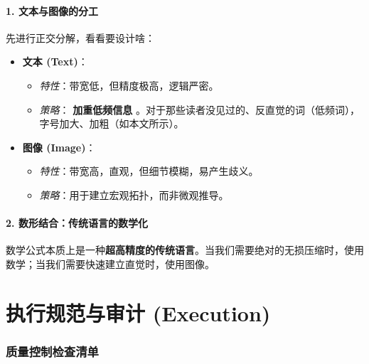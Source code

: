 \documentclass[11pt, a4paper]{article}
\newcommand{\lowfreq}[1]{%
	{\Large\bfseries\color{red!40!black} #1}%
}
\begin{document}
	\subsection{1. 文本与图像的分工}
	先进行正交分解，看看要设计啥：
	
	\begin{itemize}
		\item \textbf{文本 (Text)}：
		\begin{itemize}
			\item \textit{特性}：带宽低，但精度极高，逻辑严密。
			\item \textit{策略}：\lowfreq{加重低频信息}。对于那些读者没见过的、反直觉的词（低频词），字号加大、加粗（如本文所示）。
		\end{itemize}
		
		\item \textbf{图像 (Image)}：
		\begin{itemize}
			\item \textit{特性}：带宽高，直观，但细节模糊，易产生歧义。
			\item \textit{策略}：用于建立宏观拓扑，而非微观推导。
		\end{itemize}
	\end{itemize}
	
	\subsection{2. 数形结合：传统语言的数学化}
	数学公式本质上是一种\textbf{超高精度的传统语言}。当我们需要绝对的无损压缩时，使用数学；当我们需要快速建立直觉时，使用图像。
	
	\newpage
	
	\part{执行规范与审计 (Execution)}
	
	\section{质量控制检查清单}
	
\end{document}
